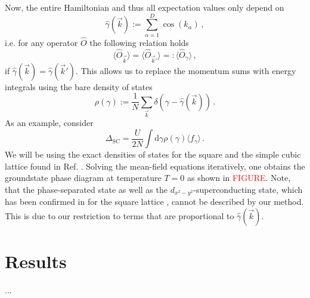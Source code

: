 \documentclass[
    reprint, 
    aps,
    preprintnumbers,
    twocolumn,
    prb,
    superscriptaddress
]{revtex4-2}
\newcommand{\vk}{\vec{k}}
\begin{document}
Now, the entire Hamiltonian and thus all expectation values only depend on
\begin{equation}
    \hat{\gamma}(\vk) := \sum_{\alpha=1}^D \cos(k_\alpha)\,,
\end{equation}
i.e. for any operator $\hat{O}$ the following relation holds 
\begin{equation}
    \langle \hat{O}_{\vk} \rangle = \langle \hat{O}_{\vk'} \rangle =: \langle \hat{O}_{\gamma} \rangle\,,
\end{equation}
if $\hat{\gamma}(\vk) = \hat{\gamma}(\vk')$.
This allows us to replace the momentum sums with energy integrals using the bare density of states
\begin{equation}
    \rho(\gamma) := \frac{1}{N} \sum_{\vk} \delta \left(\gamma - \hat{\gamma} (\vk) \right)\,.
\end{equation}
As an example, consider 
\begin{equation}
    \Delta_\text{SC} = \frac{U}{2N} \int \mathrm{d}\gamma \rho(\gamma) \langle f_{\gamma} \rangle\,.
\end{equation}
We will be using the exact densities of states for the square and the simple cubic lattice found in Ref. \cite{Hanisch97}.
Solving the mean-field equations iteratively, one obtains the groundstate phase diagram at temperature $T=0$ as shown in \textcolor{red}{FIGURE}.
Note, that the phase-separated state as well as the $d_{x^2 - y^2}$-superconducting state, which has been confirmed in for the square lattice \cite{Micnas88b,Huang13},
cannot be described by our method. This is due to our restriction to terms that are proportional to $\hat{\gamma}(\vk)$.


\section{Results}\label{sec:results}
 
...
\end{document}
